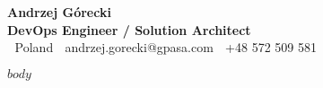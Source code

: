 \documentclass[a4paper,10pt]{article}
\begin{document}
\begin{center}
    {\Huge \textbf{Andrzej Górecki}} \\
    \vspace{0.2cm}
    \textbf{DevOps Engineer / Solution Architect} \\
    \vspace{0.1cm}
    📍 Poland \quad 📧 andrzej.gorecki@gpasa.com \quad 📱 +48 572 509 581 \\
    
\end{center}

\vspace{0.5cm}

$body$
\end{document}
